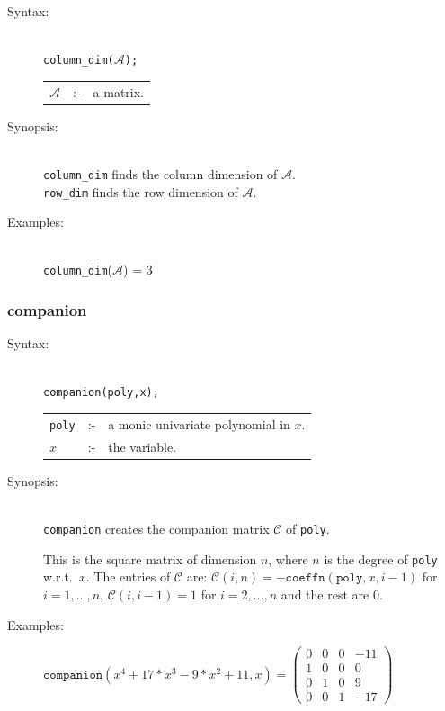 {\begin{description}
\item[Syntax:]\mbox{}\\
{\tt column\_dim($\mathcal{A}$);}\\[2mm]
\begin{tabular}{l l l}
$\mathcal{A}$ &:-& a matrix.
\end{tabular}

\item[Synopsis:]\mbox{}\\
\texttt{column\_dim} finds the column dimension of
                $\mathcal{A}$. \\
\texttt{row\_dim} finds the row dimension of $\mathcal{A}$.

\item[Examples:]\mbox{}\\
\texttt{column\_dim}($\mathcal{A}$) = 3
\end{description}

\subsubsection{companion}
\label{linalg:companion}
\hypertarget{operator:COMPANION}{}

\begin{description}
\item[Syntax:]\mbox{}\\
\texttt{companion(poly,x);}\\[2mm]
\begin{tabular}{l l l}
\texttt{poly} &:-& a monic univariate polynomial in $x$. \\
$x$    &:-& the variable.
\end{tabular}

\item[Synopsis:]\mbox{}\\
                \texttt{companion} creates the companion matrix $\mathcal{C}$
                of \texttt{poly}.

This is the square matrix of dimension $n$, where $n$ is the degree
of \texttt{poly} w.r.t.\ $x$. The entries of $\mathcal{C}$ are: $\mathcal{C}(i,n)
= -\texttt{coeffn}(\texttt{poly},x,i-1)$ for $i = 1,\ldots, n$,
$\mathcal{C}(i,i-1) = 1$ for $i=2,\ldots,n$ and the rest are $0$.

\item[Examples:]
\begin{flushleft}
\(
\texttt{companion}(x^4+17*x^3-9*x^2+11,x) =
 \begin{pmatrix} 0 & 0 & 0 & -11 \\ 1 & 0 & 0 & 0 \\
0 & 1 & 0 & 9 \\ 0 & 0 & 1 & -17 \end{pmatrix}
\)
\end{flushleft}


\end{description}}

